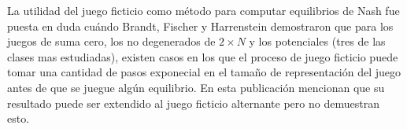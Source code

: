 La utilidad del juego ficticio como método para computar equilibrios de Nash fue puesta en duda cuándo Brandt, Fischer y Harrenstein \cite{brandt:rate:convergence} demostraron que para los juegos de suma cero, los no degenerados de $2 \times N$ y los potenciales (tres de las clases mas estudiadas), existen casos en los que el proceso de juego ficticio puede tomar una cantidad de pasos exponecial en el tamaño de representación del juego antes de que se juegue algún equilibrio. En esta publicación mencionan que su resultado puede ser extendido al juego ficticio alternante pero no demuestran esto.

